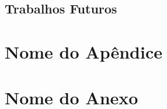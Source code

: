 \documentclass[openright]{normas-utf-tex} %
\begin{document}
	\section{Trabalhos Futuros}

		

\clearpage %
\label{bibstart}
\label{bibend}

\apendice
\chapter{Nome do Ap\^endice}

\anexo
\chapter{Nome do Anexo}
\end{document}
